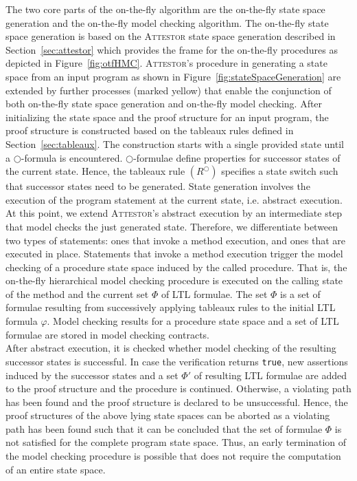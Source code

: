 \documentclass[a4paper, 12pt, twoside]{report}
\begin{document}
	The two core parts of the on-the-fly algorithm are the on-the-fly state space generation and the on-the-fly model checking algorithm.	The on-the-fly state space generation is based on the \textsc{Attestor} state space generation described in Section~\ref{sec:attestor} which provides the frame for the on-the-fly procedures as depicted in Figure~\ref{fig:otfHMC}. \textsc{Attestor}'s procedure in generating a state space from an input program as shown in Figure~\ref{fig:stateSpaceGeneration} are extended by further processes (marked yellow) that enable the conjunction of both on-the-fly state space generation and on-the-fly model checking. After initializing the state space and the proof structure for an input program, the proof structure is constructed based on the tableaux rules defined in Section~\ref{sec:tableaux}. The construction starts with a single provided state until a $\bigcirc$-formula is encountered. $\bigcirc$-formulae define properties for successor states of the current state. Hence, the tableaux rule $(R^{\bigcirc})$ specifies a state switch such that successor states need to be generated. State generation involves the execution of the program statement at the current state, i.e. abstract execution. At this point, we extend \textsc{Attestor}'s abstract execution by an intermediate step that model checks the just generated state. Therefore, we differentiate between two types of statements: ones that invoke a method execution, and ones that are executed in place. Statements that invoke a method execution trigger the model checking of a procedure state space induced by the called procedure. That is, the on-the-fly hierarchical model checking procedure is executed on the calling state of the method and the current set $\Phi$ of LTL formulae. The set $\Phi$ is a set of formulae resulting from successively applying tableaux rules to the initial LTL formula $\varphi$. Model checking results for a procedure state space and a set of LTL formulae are stored in model checking contracts.\\
	
	After abstract execution, it is checked whether model checking of the resulting successor states is successful. In case the verification returns \texttt{true}, new assertions induced by the successor states and a set $\Phi'$ of resulting LTL formulae are added to the proof structure and the procedure is continued. Otherwise, a violating path has been found and the proof structure is declared to be unsuccessful. Hence, the proof structures of the above lying state spaces can be aborted as a violating path has been found such that it can be concluded that the set of formulae $\Phi$ is not satisfied for the complete program state space. Thus, an early termination of the model checking procedure is possible that does not require the computation of an entire state space. \\
\end{document}
